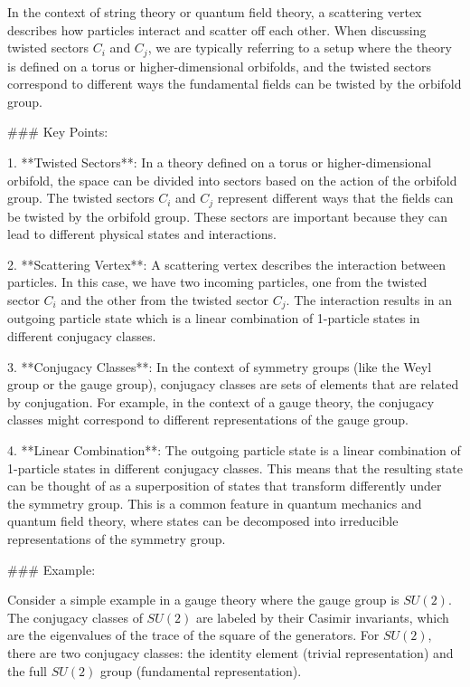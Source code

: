 In the context of string theory or quantum field theory, a scattering vertex describes how particles interact and scatter off each other. When discussing twisted sectors \(C_i\) and \(C_j\), we are typically referring to a setup where the theory is defined on a torus or higher-dimensional orbifolds, and the twisted sectors correspond to different ways the fundamental fields can be twisted by the orbifold group.

### Key Points:

1. **Twisted Sectors**: In a theory defined on a torus or higher-dimensional orbifold, the space can be divided into sectors based on the action of the orbifold group. The twisted sectors \(C_i\) and \(C_j\) represent different ways that the fields can be twisted by the orbifold group. These sectors are important because they can lead to different physical states and interactions.

2. **Scattering Vertex**: A scattering vertex describes the interaction between particles. In this case, we have two incoming particles, one from the twisted sector \(C_i\) and the other from the twisted sector \(C_j\). The interaction results in an outgoing particle state which is a linear combination of 1-particle states in different conjugacy classes.

3. **Conjugacy Classes**: In the context of symmetry groups (like the Weyl group or the gauge group), conjugacy classes are sets of elements that are related by conjugation. For example, in the context of a gauge theory, the conjugacy classes might correspond to different representations of the gauge group.

4. **Linear Combination**: The outgoing particle state is a linear combination of 1-particle states in different conjugacy classes. This means that the resulting state can be thought of as a superposition of states that transform differently under the symmetry group. This is a common feature in quantum mechanics and quantum field theory, where states can be decomposed into irreducible representations of the symmetry group.

### Example:

Consider a simple example in a gauge theory where the gauge group is \(SU(2)\). The conjugacy classes of \(SU(2)\) are labeled by their Casimir invariants, which are the eigenvalues of the trace of the square of the generators. For \(SU(2)\), there are two conjugacy classes: the identity element (trivial representation) and the full \(SU(2)\) group (fundamental representation).

